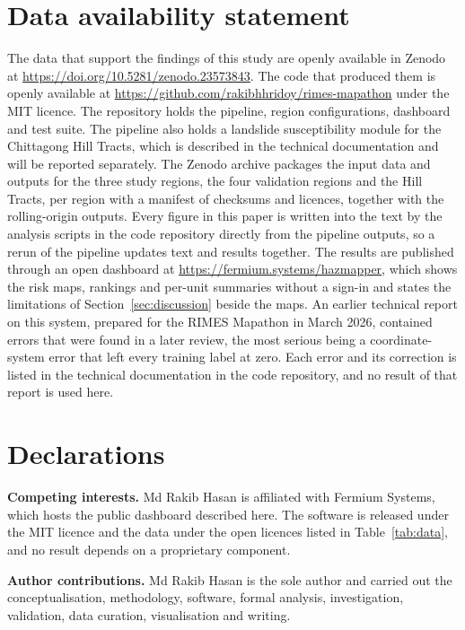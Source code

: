 \documentclass[10pt,a4paper,twocolumn]{article}
\begin{document}
\section*{Data availability statement}

The data that support the findings of this study are openly available in Zenodo at \url{https://doi.org/10.5281/zenodo.23573843}. The code that produced them is openly available at \url{https://github.com/rakibhhridoy/rimes-mapathon} under the MIT licence. The repository holds the pipeline, region configurations, dashboard and test suite. The pipeline also holds a landslide susceptibility module for the Chittagong Hill Tracts, which is described in the technical documentation and will be reported separately. The Zenodo archive packages the input data and outputs for the three study regions, the four validation regions and the Hill Tracts, per region with a manifest of checksums and licences, together with the rolling-origin outputs. Every figure in this paper is written into the text by the analysis scripts in the code repository directly from the pipeline outputs, so a rerun of the pipeline updates text and results together. The results are published through an open dashboard at \url{https://fermium.systems/hazmapper}, which shows the risk maps, rankings and per-unit summaries without a sign-in and states the limitations of Section~\ref{sec:discussion} beside the maps. An earlier technical report on this system, prepared for the RIMES Mapathon in March 2026, contained errors that were found in a later review, the most serious being a coordinate-system error that left every training label at zero. Each error and its correction is listed in the technical documentation in the code repository, and no result of that report is used here.

\section*{Declarations}

\textbf{Competing interests.} Md Rakib Hasan is affiliated with Fermium Systems, which hosts the public dashboard described here. The software is released under the MIT licence and the data under the open licences listed in Table~\ref{tab:data}, and no result depends on a proprietary component.

\textbf{Author contributions.} Md Rakib Hasan is the sole author and carried out the conceptualisation, methodology, software, formal analysis, investigation, validation, data curation, visualisation and writing.
\end{document}
